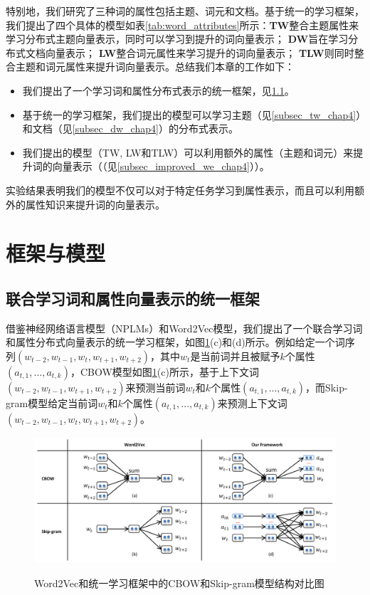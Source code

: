 \documentclass[master]{njuthesis}
\begin{document}
特别地，我们研究了三种词的属性包括主题、词元和文档。基于统一的学习框架，我们提出了四个具体的模型如表\ref{tab:word_attributes}所示：\textbf{TW}整合主题属性来学习分布式主题向量表示，同时可以学习到提升的词向量表示； \textbf{DW}旨在学习分布式文档向量表示； \textbf{LW}整合词元属性来学习提升的词向量表示； \textbf{TLW}则同时整合主题和词元属性来提升词向量表示。总结我们本章的工作如下：

\begin{itemize}
\item 我们提出了一个学习词和属性分布式表示的统一框架，见\ref{subsec_unifiedfk_chap4}。
\item 基于统一的学习框架，我们提出的模型可以学习主题（见\ref{subsec_tw_chap4}）和文档（见\ref{subsec_dw_chap4}）的分布式表示。
\item 我们提出的模型（TW, LW和TLW）可以利用额外的属性（主题和词元）来提升词的向量表示（（见\ref{subsec_improved_we_chap4}））。
\end{itemize}

实验结果表明我们的模型不仅可以对于特定任务学习到属性表示，而且可以利用额外的属性知识来提升词的向量表示。


\section{框架与模型}\label{sec_our_models_chap4}

\subsection{联合学习词和属性向量表示的统一框架}\label{subsec_unifiedfk_chap4}

借鉴神经网络语言模型（NPLMs）和Word2Vec模型，我们提出了一个联合学习词和属性分布式向量表示的统一学习框架，如图\ref{fig:ourfk_chap4}(c)和(d)所示。例如给定一个词序列$(w_{t-2}, w_{t-1}, w_t, w_{t+1}, w_{t+2})$，其中$w_t$是当前词并且被赋予$k$个属性$(a_{t,1}, ..., a_{t,k})$，CBOW模型如图\ref{fig:ourfk_chap4}(c)所示，基于上下文词$(w_{t-2}, w_{t-1}, w_{t+1}, w_{t+2})$来预测当前词$w_t$和$k$个属性$(a_{t,1}, ..., a_{t,k})$，而Skip-gram模型给定当前词$w_t$和$k$个属性$(a_{t,1}, ..., a_{t,k})$来预测上下文词$(w_{t-2}, w_{t-1}, w_t, w_{t+1}, w_{t+2})$。

\begin{figure}[htbp]
  \centering
  \includegraphics[width= 1.0\textwidth]{figures//our_framework_chap4.pdf}\\
  \caption{Word2Vec和统一学习框架中的CBOW和Skip-gram模型结构对比图}\label{fig:ourfk_chap4}
\end{figure}
\end{document}
